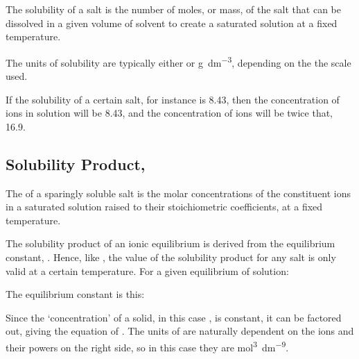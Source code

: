 			The solubility of a salt is the number of moles, or mass, of the salt that can be dissolved in a given volume of solvent to create
			a saturated solution at a fixed temperature.

			The units of solubility are typically either \si{\molarConc} or \si{\gram\per\cubic\deci\metre}, depending on the
			the scale used.

			If the solubility of a certain salt, for instance  is \SI{8.43}{\molarConc}, then the concentration of 
			ions in solution will be \SI{8.43}{\molarConc}, and the concentration of  ions will be twice that, \SI{16.9}{\molarConc}.



		\subsection{Solubility Product, \texorpdfstring{\MKsp{}}{Ksp}}

			The \Ksp{} of a sparingly soluble salt is the molar concentrations of the constituent ions in a saturated solution raised to their stoichiometric coefficients, at a fixed temperature.

			The solubility product of an ionic equilibrium is derived from the equilibrium constant, \Kc{}. Hence, like \Kc{}, the value of the solubility product for any salt is only valid at a certain temperature. For a given equilibrium of solution:


			The equilibrium constant is this:


			Since the `concentration' of a solid, in this case , is constant, it can be factored out, giving the equation of \Ksp{}. The units of \Ksp{} are naturally dependent on the ions and their powers on the right side, so in this case they are
			\si{\mole\tothe{3}\per\deci\metre\tothe{9}}.


